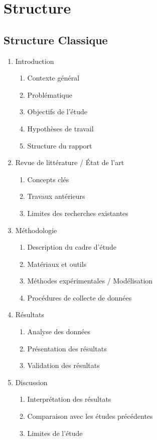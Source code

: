 \chapter{Structure}

\section{Structure Classique}

\begin{enumerate}
    \item Introduction
    \begin{enumerate}
    \item Contexte général
    \item Problématique
    \item Objectifs de l'étude
    \item Hypothèses de travail
    \item Structure du rapport
    \end{enumerate}

    \item Revue de littérature / État de l'art
    \begin{enumerate}
    \item Concepts clés
    \item Travaux antérieurs
    \item Limites des recherches existantes
    \end{enumerate}

    \item Méthodologie
    \begin{enumerate}
    \item Description du cadre d'étude
    \item Matériaux et outils
    \item Méthodes expérimentales / Modélisation
    \item Procédures de collecte de données
    \end{enumerate}

    \item Résultats
    \begin{enumerate}
    \item Analyse des données
    \item Présentation des résultats
    \item Validation des résultats
    \end{enumerate}

    \item Discussion
    \begin{enumerate}
    \item Interprétation des résultats
    \item Comparaison avec les études précédentes
    \item Limites de l'étude
    \end{enumerate}


\end{enumerate}
